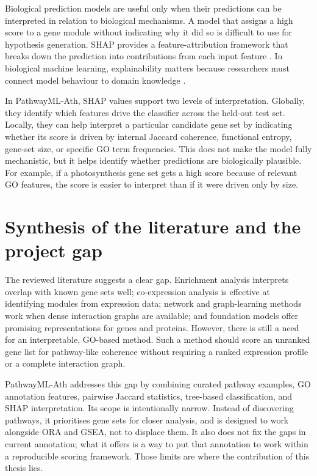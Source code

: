 \documentclass[12pt,letterpaper,oneside,openany]{book}
\begin{document}
Biological prediction models are useful only when their predictions can be interpreted in relation to biological mechanisms. A model that assigns a high score to a gene module without indicating why it did so is difficult to use for hypothesis generation. SHAP provides a feature-attribution framework that breaks down the prediction into contributions from each input feature \citep{lundberg2017unified}. In biological machine learning, explainability matters because researchers must connect model behaviour to domain knowledge \citep{strudwick2025autoxai4omics}.

In PathwayML-Ath, SHAP values support two levels of interpretation. Globally, they identify which features drive the classifier across the held-out test set. Locally, they can help interpret a particular candidate gene set by indicating whether its score is driven by internal Jaccard coherence, functional entropy, gene-set size, or specific GO term frequencies. This does not make the model fully mechanistic, but it helps identify whether predictions are biologically plausible. For example, if a photosynthesis gene set gets a high score because of relevant GO features, the score is easier to interpret than if it were driven only by size.

\section{Synthesis of the literature and the project gap}
\label{sec:lit_synthesis}

The reviewed literature suggests a clear gap. Enrichment analysis interprets overlap with known gene sets well; co-expression analysis is effective at identifying modules from expression data; network and graph-learning methods work when dense interaction graphs are available; and foundation models offer promising representations for genes and proteins. However, there is still a need for an interpretable, GO-based method. Such a method should score an unranked gene list for pathway-like coherence without requiring a ranked expression profile or a complete interaction graph.

PathwayML-Ath addresses this gap by combining curated pathway examples, GO annotation features, pairwise Jaccard statistics, tree-based classification, and SHAP interpretation. Its scope is intentionally narrow. Instead of discovering pathways, it prioritises gene sets for closer analysis, and is designed to work alongside ORA and GSEA, not to displace them. It also does not fix the gaps in current annotation; what it offers is a way to put that annotation to work within a reproducible scoring framework. Those limits are where the contribution of this thesis lies.
\end{document}
